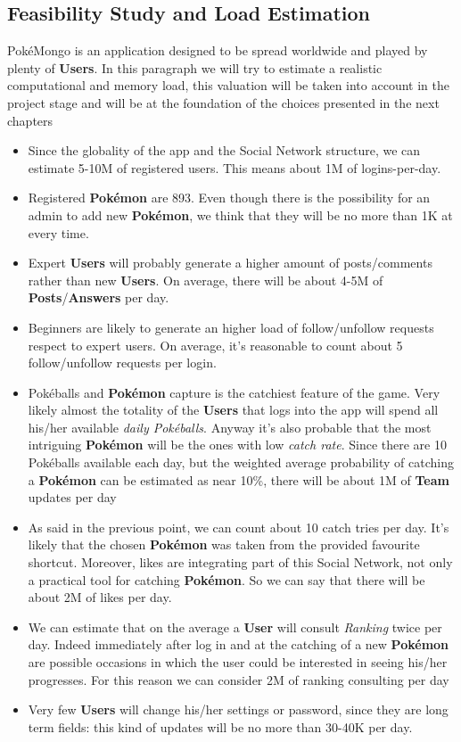 \subsection{Feasibility Study and Load Estimation}
PokéMongo is an application designed to be spread worldwide and played by plenty of \textbf{Users}. In this paragraph we will try to estimate a realistic computational and memory load, this valuation will be taken into account in the project stage and will be at the foundation of the choices presented in the next chapters

\begin{itemize}
	\item Since the globality of the app and the Social Network structure, we can estimate 5-10M of registered users. This means about 1M of logins-per-day.
	\item Registered \textbf{Pokémon} are 893. Even though there is the possibility for an admin to add new \textbf{Pokémon}, we think that they will be no more than 1K at every time.
	\item Expert \textbf{Users} will probably generate a higher amount of posts/comments rather than new \textbf{Users}. On average, there will be about 4-5M of \textbf{Posts}/\textbf{Answers} per day.
	\item Beginners are likely to generate an higher load of follow/unfollow requests respect to expert users. On average, it’s reasonable to count about 5 follow/unfollow requests per login.
	\item Pokéballs and \textbf{Pokémon} capture is the catchiest feature of the game. Very likely almost the totality of the \textbf{Users} that logs into the app will spend all his/her available \textit{daily Pokéballs}. Anyway it’s also probable that the most intriguing \textbf{Pokémon} will be the ones with low \textit{catch rate}. Since there are 10 Pokéballs available each day, but the weighted average probability of catching a \textbf{Pokémon} can be estimated as near 10\%, there will be about 1M of \textbf{Team} updates per day
	\item As said in the previous point, we can count about 10 catch tries per day. It’s likely that the chosen \textbf{Pokémon} was taken from the provided favourite shortcut. Moreover, likes are integrating part of this Social Network, not only a practical tool for catching \textbf{Pokémon}. So we can say that there will be about 2M of likes per day.
	\item We can estimate that on the average a \textbf{User} will consult \textit{Ranking} twice per day. Indeed immediately after log in and at the catching of a new \textbf{Pokémon} are possible occasions in which the user could be interested in seeing his/her progresses. For this reason we can consider 2M of ranking consulting per day
	\item Very few \textbf{Users} will change his/her settings or password, since they are long term fields: this kind of updates will be no more than 30-40K per day.
\end{itemize}

